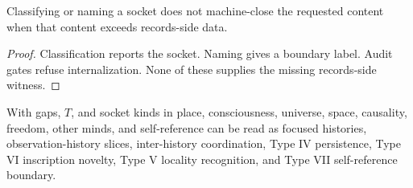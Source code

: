 \begin{corollary}
\label{cor:philosophy-boundaries-not-closed-by-naming}
Classifying or naming a socket does not machine-close the requested
content when that content exceeds records-side data.
\end{corollary}
\begin{proof}
Classification reports the socket. Naming gives a boundary label.
Audit gates refuse internalization. None of these supplies the missing
records-side witness.
\end{proof}

\begin{corollary}
\label{cor:philosophy-passage-to-phenomenology}
With gaps, \(T\), and socket kinds in place, consciousness, universe,
space, causality, freedom, other minds, and self-reference can be read
as focused histories, observation-history slices, inter-history
coordination, Type IV persistence, Type VI inscription novelty, Type V
locality recognition, and Type VII self-reference boundary.
\end{corollary}

